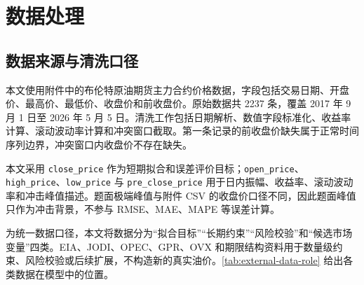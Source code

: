 \section{数据处理}

\subsection{数据来源与清洗口径}

本文使用附件中的布伦特原油期货主力合约价格数据，字段包括交易日期、开盘价、最高价、最低价、收盘价和前收盘价。原始数据共 2237 条，覆盖 2017 年 9 月 1 日至 2026 年 5 月 5 日。清洗工作包括日期解析、数值字段标准化、收益率计算、滚动波动率计算和冲突窗口截取。第一条记录的前收盘价缺失属于正常时间序列边界，冲突窗口内收盘价不存在缺失。

本文采用 \texttt{close\_price} 作为短期拟合和误差评价目标；\texttt{open\_price}、\texttt{high\_price}、\texttt{low\_price} 与 \texttt{pre\_close\_price} 用于日内振幅、收益率、滚动波动率和冲击峰值描述。题面极端峰值与附件 CSV 的收盘价口径不同，因此题面峰值只作为冲击背景，不参与 RMSE、MAE、MAPE 等误差计算。

为统一数据口径，本文将数据分为“拟合目标”“长期约束”“风险校验”和“候选市场变量”四类。EIA、JODI、OPEC、GPR、OVX 和期限结构资料用于数量级约束、风险校验或后续扩展，不构造新的真实油价。\cref{tab:external-data-role} 给出各类数据在模型中的位置。

